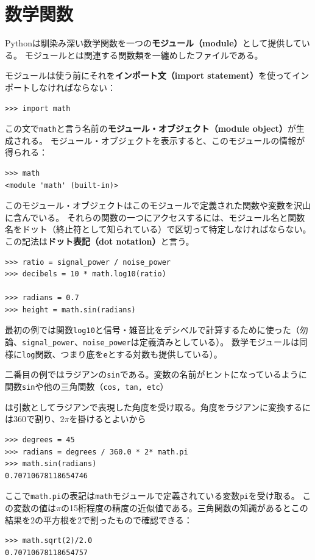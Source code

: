 \documentclass[a4j,12pt,makeidx]{jbook}
\begin{document}
{\section{数学関数}
Pythonは馴染み深い数学関数を一つの{\bf モジュール（module）}として提供している。
モジュールとは関連する関数類を一纏めしたファイルである。\par
モジュールは使う前にそれを{\bf インポート文（import statement）}を使ってインポートしなければならない：
\begin{verbatim}
>>> import math
\end{verbatim}
この文で{\tt math}と言う名前の{\bf モジュール・オブジェクト（module object）}が生成される。
モジュール・オブジェクトを表示すると、このモジュールの情報が得られる：
\begin{verbatim}
>>> math
<module 'math' (built-in)>
\end{verbatim}
このモジュール・オブジェクトはこのモジュールで定義された関数や変数を沢山に含んでいる。
それらの関数の一つにアクセスするには、モジュール名と関数名をドット（終止符として知られている）で区切って特定しなければならない。
この記法は{\bf ドット表記（dot notation）}と言う。
\begin{verbatim}
>>> ratio = signal_power / noise_power
>>> decibels = 10 * math.log10(ratio)

>>> radians = 0.7
>>> height = math.sin(radians)
\end{verbatim}
最初の例では関数{\tt log10}と信号・雑音比をデシベルで計算するために使った（勿論、{\tt signal\_power}、{\tt noise\_power}は定義済みとしている）。
数学モジュールは同様に{\tt log}関数、つまり底を{\tt e}とする対数も提供している）。\par
二番目の例ではラジアンの{\tt sin}である。変数の名前がヒントになっているように関数{\tt sin}や他の三角関数（{\tt cos, tan, etc}）}は引数としてラジアンで表現した角度を受け取る。角度をラジアンに変換するには{$ 360$}で割り、$2\pi$を掛けるとよいから
\begin{verbatim}
>>> degrees = 45
>>> radians = degrees / 360.0 * 2* math.pi
>>> math.sin(radians)
0.70710678118654746
\end{verbatim}
ここで{\tt math.pi}の表記は{\tt math}モジュールで定義されている変数{\tt pi}を受け取る。
この変数の値は$\pi$の15桁程度の精度の近似値である。三角関数の知識があるとこの結果を$2$の平方根を$2$で割ったもので確認できる：
\begin{verbatim}
>>> math.sqrt(2)/2.0
0.70710678118654757
\end{verbatim}
%
\end{document}
